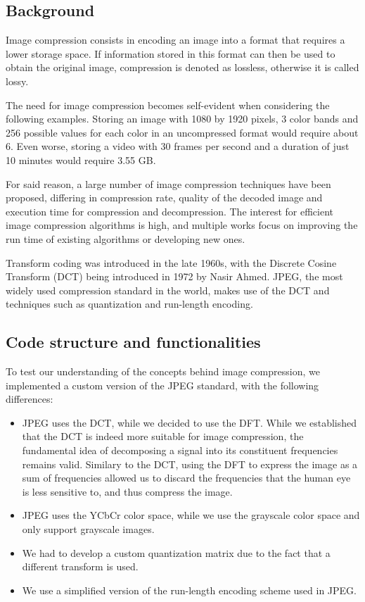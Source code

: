 \subsection{Background}
Image compression consists in encoding an image into a format that requires a lower storage space. If information stored in this format can then be used to obtain the original image, compression is denoted as lossless, otherwise it is called lossy. 

The need for image compression becomes self-evident when considering the following examples. Storing an image with 1080 by 1920 pixels, 3 color bands and 256 possible values for each color in an uncompressed format would require about 6. Even worse, storing a video with 30 frames per second and a duration of just 10 minutes would require 3.55 GB. 

For said reason, a large number of image compression techniques have been proposed\cite{compression_list_1}\cite{compression_list_2}\cite{compression_wavelet}, differing in compression rate, quality of the decoded image and execution time for compression and decompression. The interest for efficient image compression algorithms is high, and multiple works focus on improving the run time of existing algorithms or developing new ones\cite{compression_optimize_1}\cite{compression_optimize_2}.

Transform coding was introduced in the late 1960s, with the Discrete Cosine Transform (DCT) being introduced in 1972 by Nasir Ahmed\cite{dct}. JPEG\cite{jpeg}, the most widely used compression standard in the world\cite{jpeg_popular}, makes use of the DCT and techniques such as quantization and run-length encoding.

\subsection{Code structure and functionalities}
To test our understanding of the concepts behind image compression, we implemented a custom version of the JPEG standard, with the following differences:
\begin{itemize}
    \item JPEG uses the DCT, while we decided to use the DFT. While we established that the DCT is indeed more suitable for image compression, the fundamental idea of decomposing a signal into its constituent frequencies remains valid. Similary to the DCT, using the DFT to express the image as a sum of frequencies allowed us to discard the frequencies that the human eye is less sensitive to, and thus compress the image.
    \item JPEG uses the YCbCr color space, while we use the grayscale color space and only support grayscale images.
    \item We had to develop a custom quantization matrix due to the fact that a different transform is used.
    \item We use a simplified version of the run-length encoding scheme used in JPEG.
\end{itemize}

